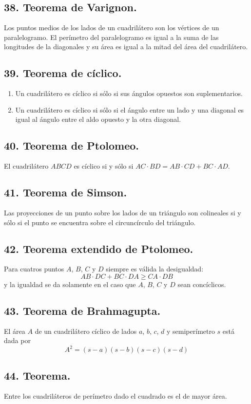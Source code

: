 \documentclass[12pt,a4paper]{article}
\begin{document}
\subsection*{38. Teorema de Varignon.}
Los puntos medios de los lados de un cuadrilátero son los vértices de un paralelogramo. El perímetro del paralelogramo es igual a la suma de las longitudes de la diagonales y su área es igual a la mitad del área del cuadrilátero. 
\subsection*{39. Teorema de cíclico.}
\begin{enumerate}
\item Un cuadrilátero es cíclico si sólo si sus ángulos opuestos son suplementarios.
\item Un cuadrilátero es cíclico si sólo si el ángulo entre un lado y una diagonal es igual al ángulo entre el aldo opuesto y la otra diagonal.
\end{enumerate}
\subsection*{40. Teorema de Ptolomeo.}
El cuadrilátero $ABCD$ es cíclico si y sólo si $AC \cdot BD = AB \cdot CD + BC \cdot AD$.
\subsection*{41. Teorema de Simson.}
Las proyecciones de un punto sobre los lados de un triángulo son colineales si y sólo si el punto se encuentra sobre el circuncírculo del triángulo.
\subsection*{42. Teorema extendido de Ptolomeo.}
Para cuatros puntos $A$, $B$, $C$ y $D$ siempre es válida la desigualdad:$$AB \cdot DC + BC\cdot DA \geq CA \cdot DB$$ 
y la igualdad se da solamente en el caso que $A$, $B$, $C$ y $D$ sean concíclicos.
\subsection*{43. Teorema de Brahmagupta.}
El área $A$ de un cuadrilátero cíclico de lados $a$, $b$, $c$, $d$ y semiperímetro $s$ está dada por $$A^2=(s-a)(s-b)(s-c)(s-d)$$
\subsection*{44. Teorema.}
Entre los cuadriláteros de perímetro dado el cuadrado es el de mayor área.
\end{document}
